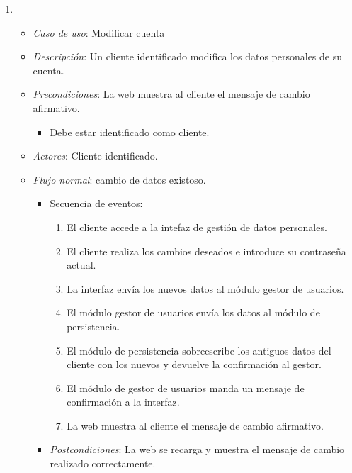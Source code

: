 \begin{enumerate}[{\bf UC-1}]
\begin{itemize}

  \end{itemize}

\item 
  \begin{itemize}
  \item {\it Caso de uso}: Modificar cuenta
  \item {\it Descripción}: Un cliente identificado modifica los datos personales de su cuenta.
  \item {\it Precondiciones}: La web muestra al cliente el mensaje de cambio afirmativo.
    \begin{itemize}
    \item Debe estar identificado como cliente.
    \end{itemize}
  \item {\it Actores}: Cliente identificado.


  \item {\it Flujo normal}: cambio de datos existoso.
    \begin{itemize}
\item Secuencia de eventos:
    \begin{enumerate}[1. ]
    \item El cliente accede a la intefaz de gestión de datos personales.
    \item	El cliente realiza los cambios deseados e introduce su contraseña actual.
    \item La interfaz envía los nuevos datos al módulo gestor de usuarios.
    \item El módulo gestor de usuarios envía los datos al módulo de persistencia.
    \item El módulo de persistencia sobreescribe los antiguos datos del cliente con los nuevos y devuelve la confirmación al gestor.
    \item El módulo de gestor de usuarios manda un mensaje de confirmación a la interfaz.
    \item La web muestra al cliente el mensaje de cambio afirmativo.
    \end{enumerate}
  \item {\it Postcondiciones}: La web se recarga y muestra el mensaje de cambio realizado correctamente.
\end{itemize}



\end{itemize}
\end{enumerate}
